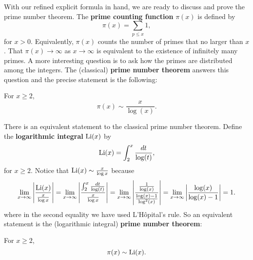     With our refined explicit formula in hand, we are ready to discuss and prove the prime number theorem. The \textbf{prime counting function} $\pi(x)$ is defined by
    \[
      \pi(x) = \sum_{p \le x}1,
    \]
    for $x > 0$. Equivalently, $\pi(x)$ counts the number of primes that no larger than $x$. That $\pi(x) \to \infty$ as $x \to \infty$ is equivalent to the existence of infinitely many primes. A more interesting question is to ask how the primes are distributed among the integers. The (classical) \textbf{prime number theorem} answers this question and the precise statement is the following:

    \begin{theorem*}
      For $x \ge 2$,
      \[
        \pi(x) \sim \frac{x}{\log(x)}.
      \]
    \end{theorem*}

    There is an equivalent statement to the classical prime number theorem. Define the \textbf{logarithmic integral} $\operatorname{\mathrm{Li}}(x)$ by
    \[
      \operatorname{\mathrm{Li}}(x) = \int_{2}^{x}\frac{dt}{\log(t)},
    \]
    for $x \ge 2$. Notice that $\operatorname{\mathrm{Li}}(x) \sim \frac{x}{\log{x}}$ because
    \[
      \lim_{x \to \infty}\left|\frac{\operatorname{\mathrm{Li}}(x)}{\frac{x}{\log{x}}}\right| = \lim_{x \to \infty}\left|\frac{\int_{2}^{x}\frac{dt}{\log(t)}}{\frac{x}{\log{x}}}\right| = \lim_{x \to \infty}\left|\frac{\frac{1}{\log(x)}}{\frac{\log(x)-1}{\log^{2}(x)}}\right| = \lim_{x \to \infty}\left|\frac{\log(x)}{\log(x)-1}\right| = 1.
    \]
    where in the second equality we have used  L'H\^opital's rule. So an equivalent statement is the (logarithmic integral) \textbf{prime number theorem}:

    \begin{theorem*}
      For $x \ge 2$,
      \[
        \pi(x) \sim \operatorname{\mathrm{Li}}(x).
      \]
    \end{theorem*}

